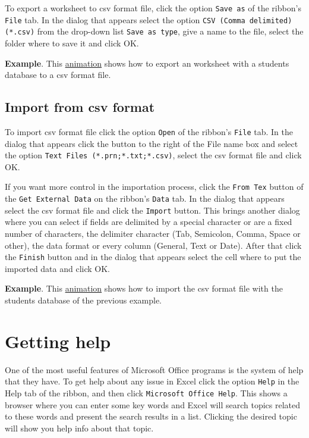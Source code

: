 To export a worksheet to csv format file, click the option \texttt{Save as} of the ribbon's \texttt{File} tab. In the dialog that appears select the option \texttt{CSV (Comma delimited) (*.csv)} from the drop-down list \texttt{Save as type}, give a name to the file, select the folder where to save it and click OK.

\textbf{Example}. This \href{http://aprendeconalf.es/office/excel/manual/img/example_export_csv.gif}{animation} shows
how to export an worksheet with a students database to a csv format file.


\subsection{Import from csv format}\hypertarget{import-from-csv-format}{}\label{import-from-csv-format}

To import csv format file click the option \texttt{Open} of the ribbon's \texttt{File} tab. In the dialog that appears click the button to the right of the File name box and select the option \texttt{Text Files (*.prn;*.txt;*.csv)}, select the csv format file and click OK.

If you want more control in the importation process, click the \texttt{From Tex} button of the \texttt{Get External Data} on the ribbon's \texttt{Data} tab. In the dialog that appears select the csv format file and click the \texttt{Import} button. This brings another dialog where you can select if fields are delimited by a special character or are a fixed number of characters, the delimiter character (Tab, Semicolon, Comma, Space or other), the data format or every column (General, Text or Date). After that click the \texttt{Finish} button and in the dialog that appears select the cell where to put the imported data and click OK.

\textbf{Example}. This \href{http://aprendeconalf.es/office/excel/manual/img/example_import_csv.gif}{animation}
shows how to import the csv format file with the students database of the previous example.


\section{Getting help}\hypertarget{getting-help}{}\label{getting-help} 

One of the most useful features of Microsoft Office programs is the system of help that they have. To get help about any issue in Excel click the option \texttt{Help} in the Help tab of the ribbon, and then click \texttt{Microsoft Office Help}. This shows a browser where you can enter some key words and Excel will search topics related to these words and present the search results in a list. Clicking the desired topic will show you help info about that topic.

